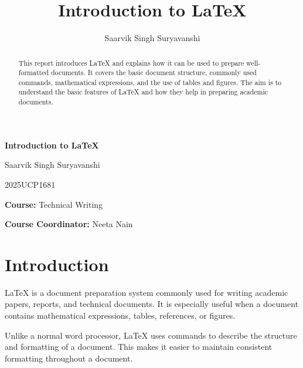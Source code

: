 \documentclass[12pt,a4paper]{report}
\title{Introduction to LaTeX}
\author{Saarvik Singh Suryavanshi}
\date{}
\begin{document}
	
	\begin{titlepage}
		\thispagestyle{empty}
		
		\centering
		
		\vspace*{3cm}
		
		{\Huge\bfseries Introduction to LaTeX\par}
		
		\vspace{2cm}
		
		{\Large Saarvik Singh Suryavanshi\par}
		
		\vspace{0.5cm}
		
		2025UCP1681
		
		\vspace{1.5cm}
		
		\textbf{Course:} Technical Writing
		
		\vspace{0.5cm}
		
		\textbf{Course Coordinator:} Neeta Nain
		
		\vfill
		
		{\large \par}
		
	\end{titlepage}
	
	\pagestyle{fancy}
	
	\begin{abstract}
		
		This report introduces LaTeX and explains how it can be
		used to prepare well-formatted documents. It covers the
		basic document structure, commonly used commands,
		mathematical expressions, and the use of tables and figures.
		The aim is to understand the basic features of LaTeX and
		how they help in preparing academic documents.
		
	\end{abstract}
	
	\section{Introduction}
	
	LaTeX is a document preparation system commonly used for
	writing academic papers, reports, and technical documents.
	It is especially useful when a document contains
	mathematical expressions, tables, references, or figures.
	
	Unlike a normal word processor, LaTeX uses commands to
	describe the structure and formatting of a document.
	This makes it easier to maintain consistent formatting
	throughout a document.
	
\end{document}

